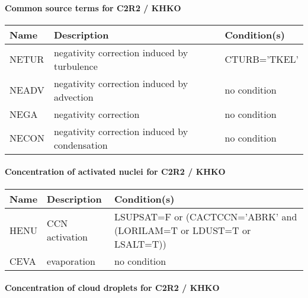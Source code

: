 \paragraph{Common source terms for C2R2 / KHKO}
\mbox{} %

\begin{longtable} {|p{}|p{}|p{}|}
\hline
Name & Description & Condition(s) \\
\hline \hline
\endhead
NETUR  & negativity correction induced by turbulence   & CTURB='TKEL' \\\hline
NEADV  & negativity correction induced by advection    & no condition \\\hline
NEGA   & negativity correction                         & no condition \\\hline
NECON  & negativity correction induced by condensation & no condition \\\hline
\end{longtable}

\paragraph{Concentration of activated nuclei for C2R2 / KHKO}
\mbox{} %

\begin{longtable} {|p{}|p{}|p{}|}
\hline
Name & Description & Condition(s) \\
\hline \hline
HENU   & CCN activation & LSUPSAT=F or (CACTCCN='ABRK' and (LORILAM=T or LDUST=T or LSALT=T)) \\\hline
CEVA   & evaporation    & no condition \\\hline
\endhead
\end{longtable}

\paragraph{Concentration of cloud droplets for C2R2 / KHKO}
\mbox{} %


